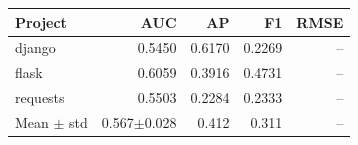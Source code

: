 \begin{tabular}{lrrrr}
\toprule
Project & AUC & AP & F1 & RMSE \\
\midrule
django & 0.5450 & 0.6170 & 0.2269 & -- \\
flask & 0.6059 & 0.3916 & 0.4731 & -- \\
requests & 0.5503 & 0.2284 & 0.2333 & -- \\
\midrule
Mean $\pm$ std & 0.567$\pm$0.028 & 0.412 & 0.311 & -- \\
\bottomrule
\end{tabular}